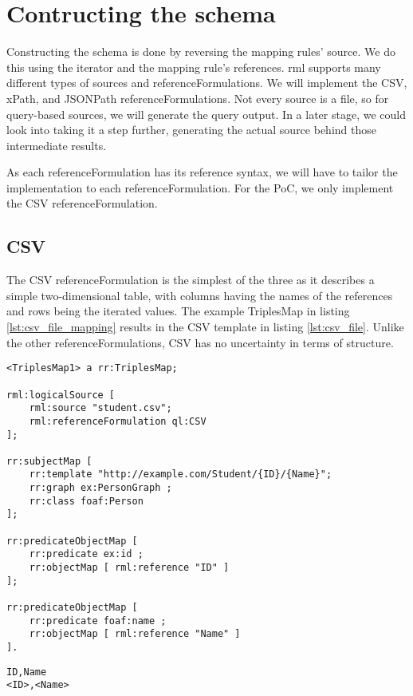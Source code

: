 \section{Contructing the schema}
\label{section:constructing_schema}
Constructing the schema is done by reversing the mapping rules' source. We do this using the iterator and the mapping rule's references. \acrshort{rml} supports many different types of sources and referenceFormulations. We will implement the CSV, xPath, and JSONPath referenceFormulations. Not every source is a file, so for query-based sources, we will generate the query output. In a later stage, we could look into taking it a step further, generating the actual source behind those intermediate results.

As each referenceFormulation has its reference syntax, we will have to tailor the implementation to each referenceFormulation. For the PoC, we only implement the CSV referenceFormulation. 

\subsection{CSV}
\label{subsection:csv}
The CSV referenceFormulation is the simplest of the three as it describes a simple two-dimensional table, with columns having the names of the references and rows being the iterated values. The example TriplesMap in listing \ref{lst:csv_file_mapping} results in the CSV template in listing \ref{lst:csv_file}. Unlike the other referenceFormulations, CSV has no uncertainty in terms of structure.

\begin{lstlisting}[caption={Example mapping for a CSV file}, label={lst:csv_file_mapping}, captionpos=b, basicstyle=\small]
<TriplesMap1> a rr:TriplesMap;

rml:logicalSource [ 
    rml:source "student.csv";
    rml:referenceFormulation ql:CSV
];

rr:subjectMap [ 
    rr:template "http://example.com/Student/{ID}/{Name}";
    rr:graph ex:PersonGraph ;
    rr:class foaf:Person
];

rr:predicateObjectMap [ 
    rr:predicate ex:id ; 
    rr:objectMap [ rml:reference "ID" ]
];

rr:predicateObjectMap [ 
    rr:predicate foaf:name ; 
    rr:objectMap [ rml:reference "Name" ]
].
\end{lstlisting}

\begin{lstlisting}[caption={Example CSV template}, label={lst:csv_file}, captionpos=b, basicstyle=\small]
ID,Name
<ID>,<Name>
\end{lstlisting}

